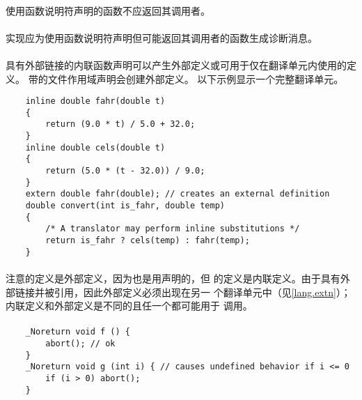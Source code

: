 {\paragraph{}
使用函数说明符声明的函数不应返回其调用者。

\recprac
\paragraph{}
实现应为使用函数说明符声明但可能返回其调用者的函数生成诊断消息。

\paragraph{}
\ex 具有外部链接的内联函数声明可以产生外部定义或可用于仅在翻译单元内使用的定义。
带的文件作用域声明会创建外部定义。 以下示例显示一个完整翻译单元。
\begin{lstlisting}
    inline double fahr(double t)
    {
        return (9.0 * t) / 5.0 + 32.0;
    }
    inline double cels(double t)
    {
        return (5.0 * (t - 32.0)) / 9.0;
    }
    extern double fahr(double); // creates an external definition
    double convert(int is_fahr, double temp)
    {
        /* A translator may perform inline substitutions */
        return is_fahr ? cels(temp) : fahr(temp);
    }
\end{lstlisting}

\paragraph{}
注意的定义是外部定义，因为也是用声明的，但
的定义是内联定义。由于具有外部链接并被引用，因此外部定义必须出现在另一
个翻译单元中（见\ref{lang.extn}）；内联定义和外部定义是不同的且任一个都可能用于
调用。

\paragraph{}
\ex
\begin{lstlisting}
    _Noreturn void f () {
        abort(); // ok
    }
    _Noreturn void g (int i) { // causes undefined behavior if i <= 0
        if (i > 0) abort();
    }
\end{lstlisting}


\syntax
\paragraph{}

}
